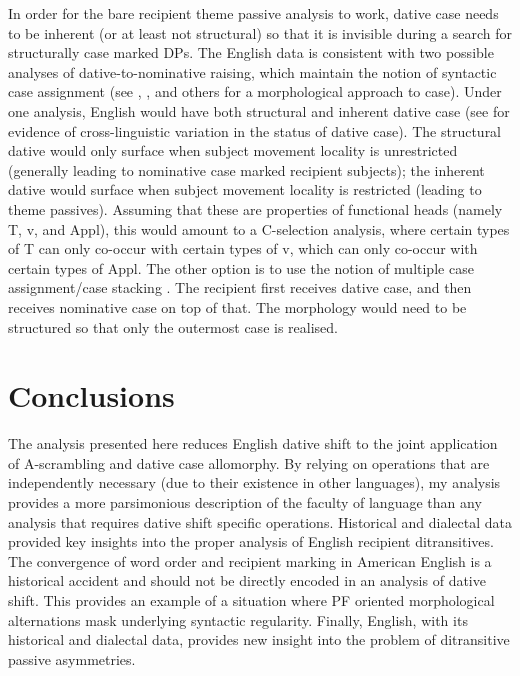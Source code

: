 In order for the bare recipient theme passive analysis to work, dative case needs to be inherent (or at least not structural) so that it is invisible during a search for structurally case marked DPs. The English data is consistent with two possible analyses of dative-to-nominative raising, which maintain the notion of syntactic case assignment (see \cite{McFadden.2004,McFadden.2006}, \cite{Alexiadou.2013b}, and others for a morphological approach to case). Under one analysis, English would have both structural and inherent dative case (see \cite{Alexiadou.2013b} for evidence of cross-linguistic variation in the status of dative case). The structural dative would only surface when subject movement locality is unrestricted (generally leading to nominative case marked recipient subjects); the inherent dative would surface when subject movement locality is restricted (leading to theme passives). Assuming that these are properties of functional heads (namely T, v, and Appl), this would amount to a C-selection analysis, where certain types of T can only co-occur with certain types of v, which can only co-occur with certain types of Appl. The other option is to use the notion of multiple case assignment/case stacking \cite{Babby.1980,Babby.1984,Young.1988,Bejar.1999,Yoon.2004,Merchant.2006,Nevins.2011,Pesetsky.2013}. The recipient first receives dative case, and then receives nominative case on top of that. The morphology would need to be structured so that only the outermost case is realised.

\section{Conclusions}
The analysis presented here reduces English dative shift to the joint application of A-scrambling and dative case allomorphy. By relying on operations that are independently necessary (due to their existence in other languages), my analysis provides a more parsimonious description of the faculty of language than any analysis that requires dative shift specific operations. Historical and dialectal data provided key insights into the proper analysis of English recipient ditransitives. The convergence of word order and recipient marking in American English is a historical accident and should not be directly encoded in an analysis of dative shift. This provides an example of a situation where PF oriented morphological alternations mask underlying syntactic regularity. Finally, English, with its historical and dialectal data, provides new insight into the problem of ditransitive passive asymmetries.

